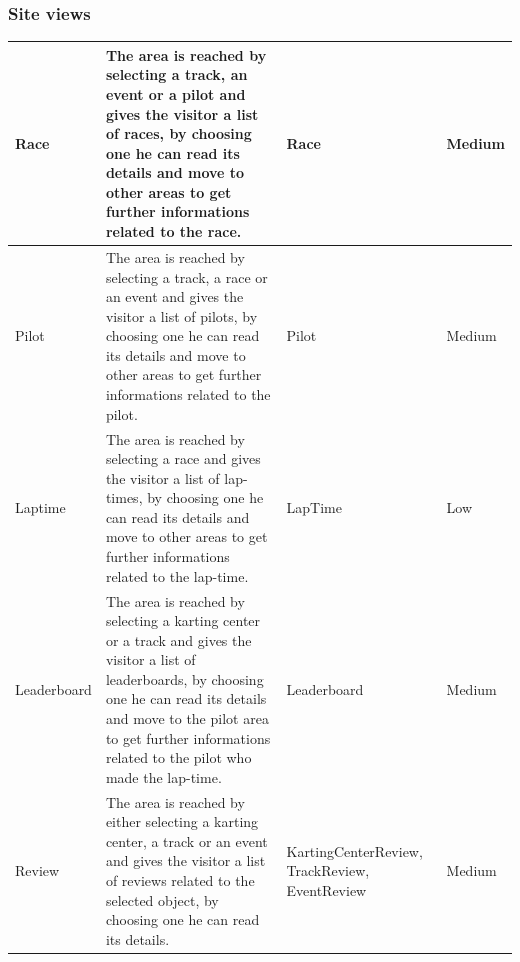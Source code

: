 \documentclass{beamer}
\begin{document}
\begin{frame}
    \frametitle{Site views}
    \begin{table}
        \centering
        \tiny
        \setlength{\tabcolsep}{1pt}
        \begin{tabular}{|m{2cm}|m{4cm}|m{3cm}|m{1cm}|}
        \hline
        Race & The area is reached by selecting a track, an event or a pilot and gives the visitor
        a list of races, by choosing one he can read its details and move to other areas to get further informations
        related to the race.
         & Race & Medium \\
        \hline
        Pilot & The area is reached by selecting a track, a race or an event and gives the visitor
        a list of pilots, by choosing one he can read its details and move to other areas to get further informations
        related to the pilot.
         & Pilot & Medium \\
        \hline
        Laptime & The area is reached by
        selecting a race and gives the visitor a list of lap-times, by choosing one he can read its details
        and move to other areas to get further informations related to the lap-time.
         & LapTime & Low \\
        \hline
        Leaderboard & The area is reached by selecting a karting center or a track
        and gives the visitor a list of leaderboards, by choosing one he can read its details
        and move to the pilot area to get further informations related to the pilot who made the lap-time.
         & Leaderboard & Medium \\
        \hline
        Review & The area is reached by either selecting a karting center, a track or an event
        and gives the visitor a list of reviews related to the selected object, by choosing one he can read its details.
         & KartingCenterReview, TrackReview, EventReview & Medium \\
        \hline
        \end{tabular}
    \end{table}
\end{frame}
\end{document}
